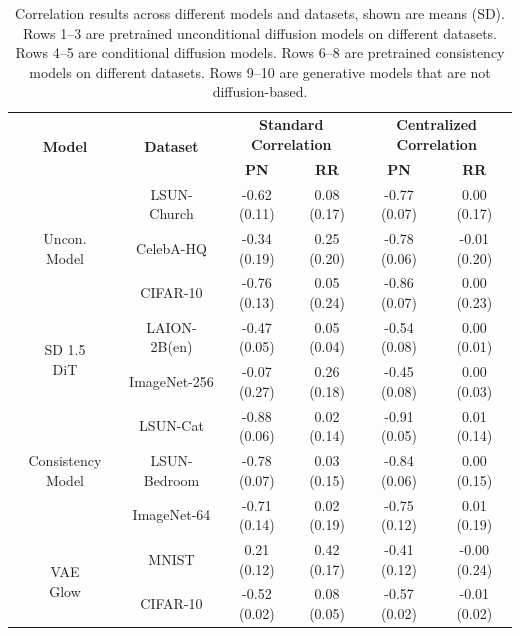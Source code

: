 \documentclass[12pt]{article}
\newcommand{\0}{\mathbf{0}}
\begin{document}
\begin{table}[htbp]
\centering
\caption{Correlation results across different models and datasets, shown are means (SD).  Rows 1–3 are pretrained unconditional diffusion models on different datasets. Rows 4–5 are conditional diffusion models. Rows 6–8 are pretrained consistency models on different datasets. Rows 9–10 are generative models that are not diffusion-based. 
}
\label{tab:full_correlation_results}

\begin{tabular}{c|c|cc|cc}
\toprule
\multirow{2}{*}{\parbox{1.7cm}{\centering \textbf{Model}}} &
\multirow{2}{*}{\textbf{Dataset}} &
\multicolumn{2}{c|}{\textbf{Standard Correlation}} &
\multicolumn{2}{c}{\textbf{Centralized Correlation}} \\
 & & \textbf{PN} & \textbf{RR} & \textbf{PN} & \textbf{RR} \\
\midrule

\multirow{3}{*}{\parbox{1.7cm}{\centering Uncon. \\ Model}}
 & LSUN-Church & -0.62 (0.11) & 0.08 (0.17) & -0.77 (0.07) & 0.00 (0.17) \\
 & CelebA-HQ & -0.34 (0.19) & 0.25 (0.20) & -0.78 (0.06) & -0.01 (0.20) \\
 & CIFAR-10 & -0.76 (0.13) & 0.05 (0.24) & -0.86 (0.07) & 0.00 (0.23) \\
\midrule

\multirow{2}{*}{\parbox{1.7cm}{\centering SD 1.5 \\ DiT}}
 & LAION-2B(en) & -0.47 (0.05) & 0.05 (0.04) & -0.54 (0.08) & 0.00 (0.01) \\
 & ImageNet-256 & -0.07 (0.27) & 0.26 (0.18) & -0.45 (0.08) & 0.00 (0.03) \\
\midrule

\multirow{3}{*}{\parbox{1.7cm}{\centering Consistency Model}}
 & LSUN-Cat & -0.88 (0.06) & 0.02 (0.14) & -0.91 (0.05) & 0.01 (0.14) \\
 & LSUN-Bedroom & -0.78 (0.07) & 0.03 (0.15) & -0.84 (0.06) & 0.00 (0.15) \\
 & ImageNet-64 & -0.71 (0.14) & 0.02 (0.19) & -0.75 (0.12) & 0.01 (0.19) \\
\midrule

\multirow{2}{*}{\parbox{1.7cm}{\centering VAE \\ Glow}}
 & MNIST & 0.21 (0.12) & 0.42 (0.17) & -0.41 (0.12) & -0.00 (0.24) \\
 & CIFAR-10 & -0.52 (0.02) & 0.08 (0.05) & -0.57 (0.02) & -0.01 (0.02) \\
\bottomrule
\end{tabular}
\end{table}
\end{document}
